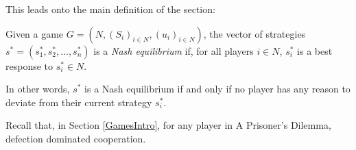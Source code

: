 This leads onto the main definition of the section:
\begin{definition}
    Given a game $G=(N, (S_{i})_{i \in N}, (u_{i})_{i \in N})$, the vector of
    strategies $s^{*} = (s_{1}^{*}, s_{2}^{*}, ..., s_{n}^{*})$ is a
    \textit{Nash equilibrium} if, for all players $i \in N$, $s_{i}^{*}$ is a
    best response to $s_{i}^{*} \in N$. \cite{maschler_solan_zamir_2013}
\end{definition}
In other words, $s^{*}$ is a Nash equilibrium if and only if no player has any
reason to deviate from their current strategy $s_{i}^{*}$.

Recall that, in Section \ref{GamesIntro}, for any player in A Prisoner's
Dilemma, defection dominated cooperation.